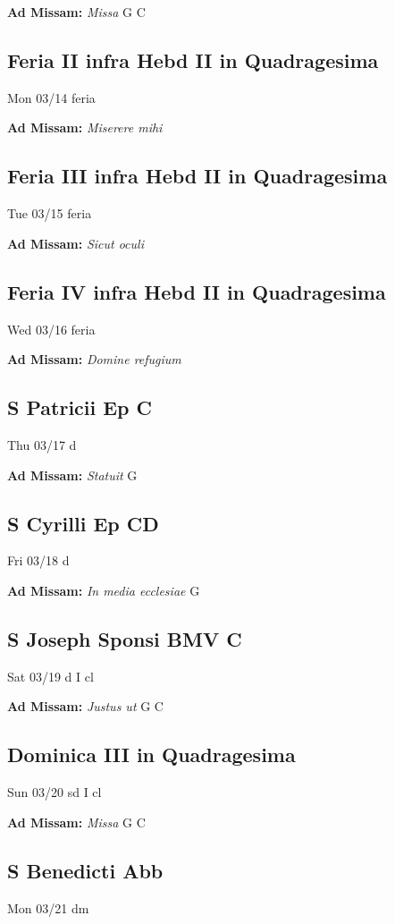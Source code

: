 \documentclass[letterpaper, 10pt, twocolumn]{article}
\begin{document}
\textbf{Ad Missam:} \textit{Missa} G C 

\subsection*{Feria II infra Hebd II in Quadragesima}Mon 03/14 feria

\textbf{Ad Missam:} \textit{Miserere mihi} 

\subsection*{Feria III infra Hebd II in Quadragesima}Tue 03/15 feria

\textbf{Ad Missam:} \textit{Sicut oculi} 

\subsection*{Feria IV infra Hebd II in Quadragesima}Wed 03/16 feria

\textbf{Ad Missam:} \textit{Domine refugium} 

\subsection*{S Patricii Ep C}Thu 03/17 d

\textbf{Ad Missam:} \textit{Statuit} G 

\subsection*{S Cyrilli Ep CD}Fri 03/18 d

\textbf{Ad Missam:} \textit{In media ecclesiae} G 

\subsection*{S Joseph Sponsi BMV C}Sat 03/19 d I cl

\textbf{Ad Missam:} \textit{Justus ut} G C 

\subsection*{Dominica III in Quadragesima}Sun 03/20 sd I cl

\textbf{Ad Missam:} \textit{Missa} G C 

\subsection*{S Benedicti Abb}Mon 03/21 dm
\end{document}
